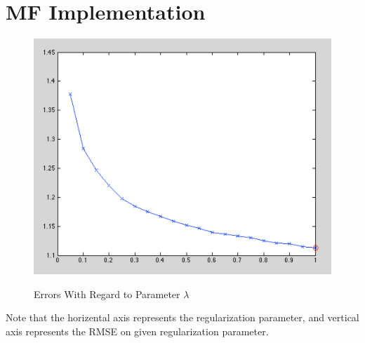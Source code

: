 \documentclass[11pt,a4paper]{article}
\begin{document}
\begin{titlepage}
    \maketitle
\end{titlepage}
\renewcommand{\contentsname}{Contents}
\begin{center} 
    \tableofcontents 
    \listoffigures
\end{center}
\newpage

\newcommand{\uk}{\ensuremath{U^{(K_i)}}}
\newcommand{\ukt}{\ensuremath{U^{(K_i)^T}}}
\newcommand{\mk}{\ensuremath{M^{(K_i)}}}
\newcommand{\mkt}{\ensuremath{M^{(K_i)^T}}}
\section{MF Implementation}

\begin{figure}[h]
    \centering
    \includegraphics[width=5in,height=3.5in]{./lambda_error.png} \\
    \caption{Errors With Regard to Parameter $\lambda$}
\end{figure}
Note that the horizental axis represents the regularization parameter, and
vertical axis represents the RMSE on given regularization parameter. 
\end{document}
